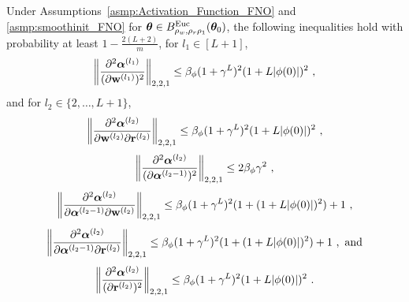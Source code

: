 \begin{lemm}
\label{lemm:cross-w-r-bound}
    Under Assumptions~\ref{asmp:Activation_Function_FNO} and \ref{asmp:smoothinit_FNO} for ${\bm{\theta}} \in B^{\mathrm{Euc}}_{\rho_w,\rho_r\rho_1} ({\bm{\theta}}_0)$, the following inequalities hold with probability at least $1 - \frac{2(L+2)}{m}$, for $l_1\in[L+1]$,
    \begin{equation}
    \label{eq:norm_d_alpha_l_w_l_w_l}\left\|\frac{\partial^2\boldsymbol{\alpha}^{{(l_1)}}}{(\partial{\mathbf{w}^{(l_1)}})^2} \right\|_{2,2,1} \leq \beta_{\phi}(1+\gamma^L)^2(1+L|\phi(0)|)^2~,
    \end{equation}
%    
and for $l_2\in\{2,\dots,L+1\}$,
    \begin{equation}
        \label{eq:norm_d_alpha_l_w_l_r_l}
        \left\|\frac{\partial^2\boldsymbol{\alpha}^{{(l_2)}}}{\partial{\mathbf{w}^{(l_2)}}\partial \mathbf{r}^{(l_2)}} \right\|_{2,2,1} \leq
        \beta_{\phi}(1+\gamma^L)^2(1+L|\phi(0)|)^2        ~,
    \end{equation}
    \begin{equation}
        \label{eq:norm_d_alpha_l_alpha_l_minus_1}
        \left\| \frac{\partial^2 \boldsymbol{\alpha}^{(l_2)}}{(\partial \boldsymbol{\alpha}^{(l_2-1)})^2} \right\|_{2,2,1} \leq 2\beta_\phi\gamma^2~,
    \end{equation}
    \begin{equation}
    \label{eq:norm_d_alpha_l_alpha_l_w_l}\left\|\frac{\partial^2\boldsymbol{\alpha}^{{(l_2)}}}{\partial \boldsymbol{\alpha}^{(l_2-1)}\partial{\mathbf{w}^{(l_2)}}} \right\|_{2,2,1} \leq \beta_{\phi}(1+\gamma^L)^2(1+(1+L|\phi(0)|)^2)+1~,
    \end{equation}
    \begin{equation}
        \label{eq:norm_d_alpha_l2_alpha_l2_minus_1_dr}
        \left\|\frac{\partial^2\boldsymbol{\alpha}^{{(l_2)}}}{\partial{\boldsymbol{\alpha}^{(l_2-1)}}\partial \mathbf{r}^{(l_2)}} \right\|_{2,2,1}
        \leq \beta_{\phi}(1+\gamma^L)^2(1+(1+L|\phi(0)|)^2)+1
        ~, \text{ and}
    \end{equation}
        \begin{equation}
    \label{eq:norm_d_alpha_l_r_l_r_l}\left\|\frac{\partial^2\boldsymbol{\alpha}^{{(l_2)}}}{(\partial{\mathbf{r}^{(l_2)}})^2} \right\|_{2,2,1} \leq \beta_{\phi}(1+\gamma^L)^2(1+L|\phi(0)|)^2~.
    \end{equation}
    \end{lemm}
    
